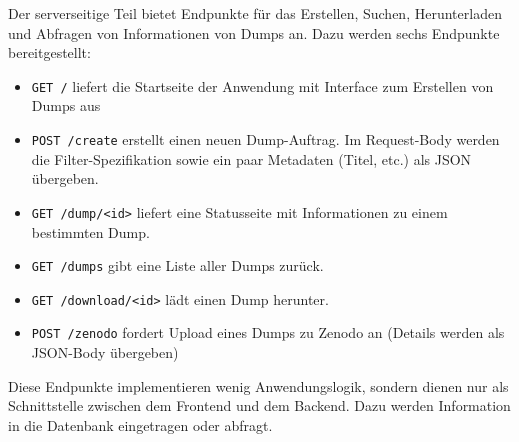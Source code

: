 Der serverseitige Teil bietet Endpunkte für das Erstellen, Suchen, Herunterladen und Abfragen von Informationen von Dumps an.
Dazu werden sechs Endpunkte bereitgestellt:
\begin{itemize}
\item \verb|GET /| liefert die Startseite der Anwendung mit Interface zum Erstellen von Dumps aus
\item \verb|POST /create| erstellt einen neuen Dump-Auftrag. Im Request-Body werden die Filter-Spezifikation sowie ein paar Metadaten (Titel, etc.) als JSON übergeben.
\item \verb|GET /dump/<id>| liefert eine Statusseite mit Informationen zu einem bestimmten Dump.
\item \verb|GET /dumps| gibt eine Liste aller Dumps zurück.
\item \verb|GET /download/<id>| lädt einen Dump herunter.
\item \verb|POST /zenodo| fordert Upload eines Dumps zu Zenodo an (Details werden als JSON-Body übergeben)
\end{itemize}
Diese Endpunkte implementieren wenig Anwendungslogik, sondern dienen nur als Schnittstelle zwischen dem Frontend und dem Backend.
Dazu werden Information in die Datenbank eingetragen oder abfragt.